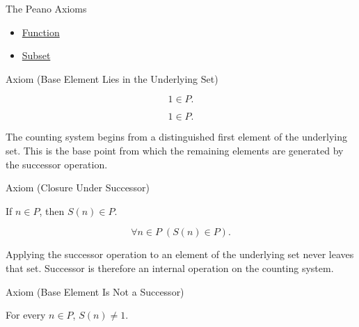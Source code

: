 \begin{topicbox}{The Peano Axioms}
\begin{dependencies}
\begin{itemize}
  \item \hyperref[def:function]{Function}
  \item \hyperref[def:subset]{Subset}
\end{itemize}
\end{dependencies}

\begin{axiombox}{Axiom (Base Element Lies in the Underlying Set)}
\begin{axiom}
\label{ax:peano-base-in-set}
\[
1 \in P.
\]
\end{axiom}
\end{axiombox}

\begin{remark*}
\[
1 \in P.
\]
\end{remark*}

\begin{remark*}[Interpretation]
The counting system begins from a distinguished first element of the
underlying set. This is the base point from which the remaining elements are
generated by the successor operation.
\end{remark*}

\NoLocalDependencies

\begin{axiombox}{Axiom (Closure Under Successor)}
\begin{axiom}
\label{ax:peano-successor-closure}
If $n \in P$, then $S(n) \in P$.
\end{axiom}
\end{axiombox}

\begin{remark*}
\[
\forall n \in P\;(S(n) \in P).
\]
\end{remark*}

\begin{remark*}[Interpretation]
Applying the successor operation to an element of the underlying set never
leaves that set. Successor is therefore an internal operation on the counting
system.
\end{remark*}

\NoLocalDependencies

\begin{axiombox}{Axiom (Base Element Is Not a Successor)}
\begin{axiom}
\label{ax:peano-base-not-successor}
For every $n \in P$, $S(n) \neq 1$.
\end{axiom}
\end{axiombox}


\end{topicbox}
